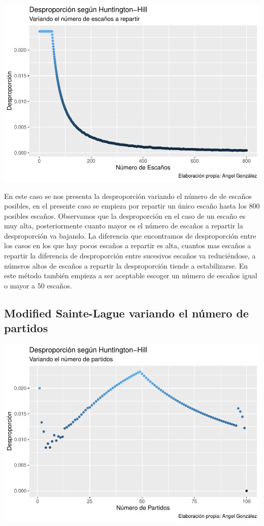 \documentclass[12pt,a4paper,]{book}
\numberwithin{dummy}{section}
\theoremstyle{ocrenumbox}
\theoremstyle{blacknumex}
\theoremstyle{blacknumbox}
\theoremstyle{ocrenum}
\theoremstyle{ocrenum}
\begin{document}
\begin{center}\includegraphics[width=0.95\linewidth]{figurasR/unnamed-chunk-26-1} \end{center}

En este caso se nos presenta la desproporción variando el número de de
escaños posibles, en el presente caso se empieza por repartir un único
escaño hasta los 800 posibles escaños. Observamos que la desproporción
en el caso de un escaño es muy alta, posteriormente cuanto mayor es el
número de escaños a repartir la desproporción va bajando. La diferencia
que encontramos de desproporción entre los casos en los que hay pocos
escaños a repartir es alta, cuantos mas escaños a repartir la diferencia
de desproporción entre sucesivos escaños va reduciéndose, a números
altos de escaños a repartir la desproporción tiende a estabilizarse. En
este método también empieza a ser aceptable escoger un número de escaños
igual o mayor a 50 escaños.

\hypertarget{modified-sainte-lague-variando-el-nuxfamero-de-partidos}{%
\subsection{Modified Sainte-Lague variando el número de
partidos}\label{modified-sainte-lague-variando-el-nuxfamero-de-partidos}}

\begin{center}\includegraphics[width=0.95\linewidth]{figurasR/unnamed-chunk-27-1} \end{center}
\end{document}
